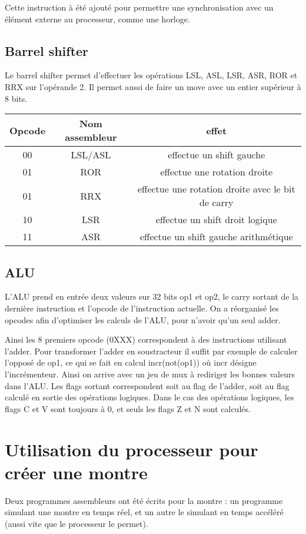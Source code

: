 \documentclass[a4paper]{article}
\begin{document}
Cette instruction à été ajouté pour permettre une synchronisation avec un
élément externe au processeur, comme une horloge.

\subsection{Barrel shifter}

Le barrel shifter permet d'effectuer les opérations LSL, ASL, LSR, ASR, ROR et
RRX sur l'opérande 2. Il permet aussi de faire un move avec un entier supérieur
à 8 bits.

\begin{tabular}{|c|c|c|}
  \hline
  Opcode & Nom assembleur & effet \\
  \hline
  00 & LSL/ASL & effectue un shift gauche\\
  01 & ROR & effectue une rotation droite\\
  01 & RRX & effectue une rotation droite avec le bit de carry\\
  10 & LSR & effectue un shift droit logique\\
  11 & ASR & effectue un shift gauche arithmétique\\
  \hline
\end{tabular}

\subsection{ALU}
L'ALU prend en entrée deux valeurs sur 32 bits op1 et op2, le carry sortant de la dernière instruction et l'opcode de l'instruction actuelle.
On a réorganisé les opcodes afin d'optimiser les calculs de l'ALU, pour n'avoir qu'un seul adder.

Ainsi les 8 premiers opcode (0XXX) correspondent à des instructions utilisant l'adder.
Pour transformer l'adder en soustracteur il suffit par exemple de calculer l'opposé de op1, ce qui se fait en calcul incr(not(op1)) où incr désigne l'incrémenteur.
Ainsi on arrive avec un jeu de mux à rediriger les bonnes valeurs dans l'ALU.
Les flags sortant correspondent soit au flag de l'adder, soit au flag calculé en sortie des opérations logiques. Dans le cas des opérations logiques, les flags C et V
sont toujours à 0, et seuls les flags Z et N sont calculés.
\section{Utilisation du processeur pour créer une montre}

Deux programmes assembleurs ont été écrits pour la montre : un programme
simulant une montre en temps réel, et un autre le simulant en temps accéléré
(aussi vite que le processeur le permet).
\end{document}

